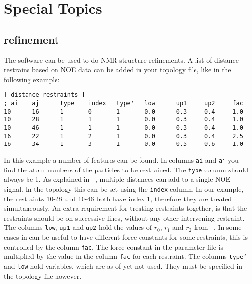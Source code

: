 \chapter{Special Topics}
\label{ch:special}
\section{ refinement}
The {\gromacs} software can be used to do NMR structure refinements.
A list of distance restrains based on NOE data can be added in your
topology file, like in the following example:
\begin{verbatim}
[ distance_restraints ]
; ai    aj      type    index   type'   low      up1     up2     fac
10      16      1       0       1       0.0      0.3     0.4     1.0 
10      28      1       1       1       0.0      0.3     0.4     1.0 
10      46      1       1       1       0.0      0.3     0.4     1.0 
16      22      1       2       1       0.0      0.3     0.4     2.5 
16      34      1       3       1       0.0      0.5     0.6     1.0 
\end{verbatim}
In this example a number of features can be found.
In columns {\tt ai} and {\tt aj} you find the atom numbers of the
particles to be restrained. The {\tt type} column should always be 1.
As explained in ~, multiple distances can add
to a single NOE signal. In the topology this can be set using the
{\tt index} column. In our example, the restraints 10-28 and 10-46
both have index 1, therefore they are treated simultaneously.
An extra requirement for treating restraints together, is that 
the restraints should be on successive lines, without any
other intervening restraint. The columns {\tt low}, {\tt up1} and {\tt up2}
hold the values of $r_0$, $r_1$ and $r_2$ from ~.
In some cases in can be useful to have different force constants for
some restraints, this is controlled by the column {\tt fac}.
The force constant in the parameter file is multiplied by the value in the
column {\tt fac} for each restraint.
The columns {\tt type'} and {\tt low} hold variables, which are as of yet 
not used. They must be specified in the topology file however.

